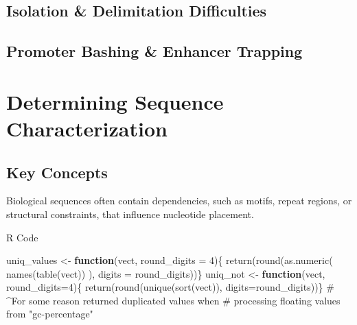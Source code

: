 \documentclass[
  letterpaper,
]{article}
\newenvironment{Shaded}{\begin{snugshade}}{\end{snugshade}}
\newcommand{\AttributeTok}[1]{\textcolor[rgb]{0.40,0.45,0.13}{#1}}
\newcommand{\CommentTok}[1]{\textcolor[rgb]{0.37,0.37,0.37}{#1}}
\newcommand{\ControlFlowTok}[1]{\textcolor[rgb]{0.00,0.23,0.31}{\textbf{#1}}}
\newcommand{\DecValTok}[1]{\textcolor[rgb]{0.68,0.00,0.00}{#1}}
\newcommand{\FunctionTok}[1]{\textcolor[rgb]{0.28,0.35,0.67}{#1}}
\newcommand{\NormalTok}[1]{\textcolor[rgb]{0.00,0.23,0.31}{#1}}
\newcommand{\OtherTok}[1]{\textcolor[rgb]{0.00,0.23,0.31}{#1}}
\begin{document}
\subsection{Isolation \& Delimitation
Difficulties}\label{isolation-delimitation-difficulties}

\subsection{Promoter Bashing \& Enhancer
Trapping}\label{promoter-bashing-enhancer-trapping}

\section{Determining Sequence
Characterization}\label{determining-sequence-characterization}

\subsection{Key Concepts}\label{key-concepts}

Biological sequences often contain dependencies, such as motifs, repeat
regions, or structural constraints, that influence nucleotide placement.

\begin{rheader}
R Code
\end{rheader}

\begin{Shaded}
\begin{Highlighting}[]
\NormalTok{uniq\_values }\OtherTok{\textless{}{-}} \ControlFlowTok{function}\NormalTok{(vect, }\AttributeTok{round\_digits =} \DecValTok{4}\NormalTok{)\{}
  \FunctionTok{return}\NormalTok{(}\FunctionTok{round}\NormalTok{(}\FunctionTok{as.numeric}\NormalTok{(}
                 \FunctionTok{names}\NormalTok{(}\FunctionTok{table}\NormalTok{(vect))}
\NormalTok{         ), }\AttributeTok{digits =}\NormalTok{ round\_digits))\}}
\NormalTok{uniq\_not }\OtherTok{\textless{}{-}} \ControlFlowTok{function}\NormalTok{(vect, }\AttributeTok{round\_digits=}\DecValTok{4}\NormalTok{)\{}
  \FunctionTok{return}\NormalTok{(}\FunctionTok{round}\NormalTok{(}\FunctionTok{unique}\NormalTok{(}\FunctionTok{sort}\NormalTok{(vect)), }\AttributeTok{digits=}\NormalTok{round\_digits))\}}
\CommentTok{\# \^{}For some reason returned duplicated values when }
\CommentTok{\#  processing floating values from "gc{-}percentage"}
\end{Highlighting}
\end{Shaded}
\end{document}
